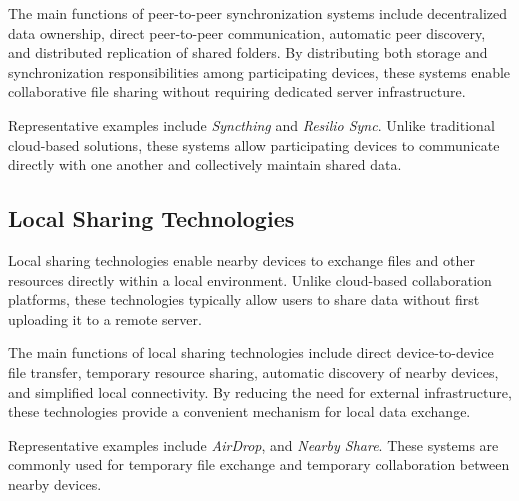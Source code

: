 The main functions of peer-to-peer synchronization systems include decentralized data ownership, direct peer-to-peer communication, automatic peer discovery, and distributed replication of shared folders.
By distributing both storage and synchronization responsibilities among participating devices, these systems enable collaborative file sharing without requiring dedicated server infrastructure.

Representative examples include \textit{Syncthing} and \textit{Resilio Sync}. Unlike traditional cloud-based solutions, these systems allow participating devices to communicate directly with one another and collectively maintain shared data.


\subsection{Local Sharing Technologies}

%
%

Local sharing technologies enable nearby devices to exchange files and other resources directly within a local environment.
Unlike cloud-based collaboration platforms, these technologies typically allow users to share data without first uploading it to a remote server.


The main functions of local sharing technologies include direct device-to-device file transfer, temporary resource sharing, automatic discovery of nearby devices, and simplified local connectivity.
By reducing the need for external infrastructure, these technologies provide a convenient mechanism for local data exchange.

Representative examples include \textit{AirDrop}, and \textit{Nearby Share}.
These systems are commonly used for temporary file exchange and temporary collaboration between nearby devices.


